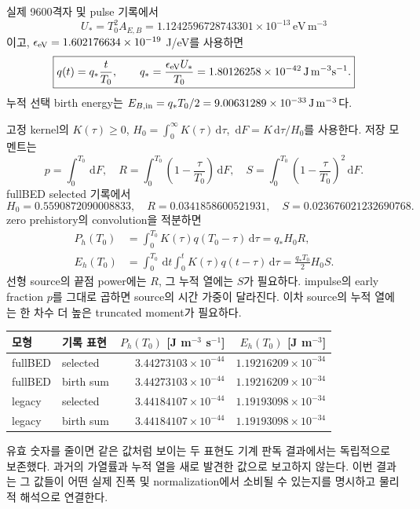 \documentclass[11pt,a4paper]{article}
\newcommand{\dd}{\,\mathrm{d}}
\newcommand{\units}[1]{\,\mathrm{#1}}
\begin{document}
실제 9600격자 및 pulse 기록에서
\[
U_*=T_0^2 A_{E,B}=1.1242596728743301\times10^{-13}
\units{eV\,m^{-3}}
\]
이고, \(\epsilon_{\rm eV}=1.602176634\times10^{-19}\) J/eV를 사용하면
\begin{equation}
\boxed{q(t)=q_*\frac{t}{T_0},\qquad
q_*=\frac{\epsilon_{\rm eV}U_*}{T_0}
=\SourcePower\units{J\,m^{-3}s^{-1}}.}
\end{equation}
누적 선택 birth energy는 \(E_{B,\rm in}=q_*T_0/2=\InjectedEnergy\units{J\,m^{-3}}\)다.

고정 kernel의 \(K(\tau)\ge0\), \(H_0=\int_0^\infty K(\tau)\dd\tau\),
\(\dd F=K\dd\tau/H_0\)를 사용한다. 저장 모멘트는
\[
p=\int_0^{T_0}\dd F,\quad
R=\int_0^{T_0}\left(1-\frac{\tau}{T_0}\right)\dd F,\quad
S=\int_0^{T_0}\left(1-\frac{\tau}{T_0}\right)^2\dd F.
\]
fullBED selected 기록에서
\[
H_0=0.5590872090008833,\quad R=0.0341858600521931,\quad
S=0.023676021232690768.
\]
zero prehistory의 convolution을 적분하면
\begin{align}
P_h(T_0)
&=\int_0^{T_0}K(\tau)q(T_0-\tau)\dd\tau=q_*H_0R,\\
E_h(T_0)
&=\int_0^{T_0}\dd t\int_0^tK(\tau)q(t-\tau)\dd\tau
=\frac{q_*T_0}{2}H_0S.
\end{align}
선형 source의 끝점 power에는 \(R\), 그 누적 열에는 \(S\)가 필요하다.
impulse의 early fraction \(p\)를 그대로 곱하면 source의 시간 가중이 달라진다.
이차 source의 누적 열에는 한 차수 더 높은 truncated moment가 필요하다.\cite{m0,pulse}

\begin{center}
\small
\begin{tabular}{llrr}
\toprule
모형 & 기록 표현 & \(P_h(T_0)\) [J m\(^{-3}\) s\(^{-1}\)] & \(E_h(T_0)\) [J m\(^{-3}\)]\\
\midrule
fullBED & selected & \(3.44273103\times10^{-44}\) & \(1.19216209\times10^{-34}\)\\
fullBED & birth sum & \(3.44273103\times10^{-44}\) & \(1.19216209\times10^{-34}\)\\
legacy & selected & \(3.44184107\times10^{-44}\) & \(1.19193098\times10^{-34}\)\\
legacy & birth sum & \(3.44184107\times10^{-44}\) & \(1.19193098\times10^{-34}\)\\
\bottomrule
\end{tabular}
\end{center}
유효 숫자를 줄이면 같은 값처럼 보이는 두 표현도 기계 판독 결과에서는 독립적으로 보존했다.
과거의 가열률과 누적 열을 새로 발견한 값으로 보고하지 않는다. 이번 결과는 그 값들이
어떤 실제 진폭 및 normalization에서 소비될 수 있는지를 명시하고 물리적 해석으로 연결한다.
\end{document}
